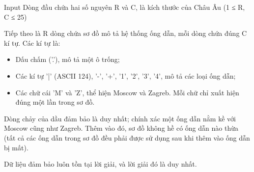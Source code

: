 Input
Dòng đầu chứa hai số nguyên R và C, là kích thước của Châu Âu (1 ≤ R, C ≤ 25)  

   Tiếp theo là R dòng chứa sơ đồ mô tả hệ thống ống dẫn, mỗi dòng chứa đúng C kí tự. Các kí tự là:  
\begin{itemize}
	\item     Dấu chấm ('.'), mô tả một ô trống;   
	\item     Các kí tự '|' (ASCII 124), '-', '+', '1', '2', '3', '4', mô tả các loại ống dẫn;   
	\item     Các chữ cái 'M' và 'Z', thể hiện Moscow và Zagreb. Mỗi chữ chỉ xuất hiện đúng một lần trong sơ đồ.   
\end{itemize}

   Dòng chảy của dầu đảm bảo là duy nhất; chính xác một ống dẫn nằm kề với Moscow cũng như Zagreb. Thêm vào đó, sơ đồ không hề có ống dẫn nào thừa (tất cả các ống dẫn trong sơ đồ đều phải được sử dụng sau khi thêm vào ống dẫn bị mất).  

   Dữ liệu đảm bảo luôn tồn tại lời giải, và lời giải đó là duy nhất.